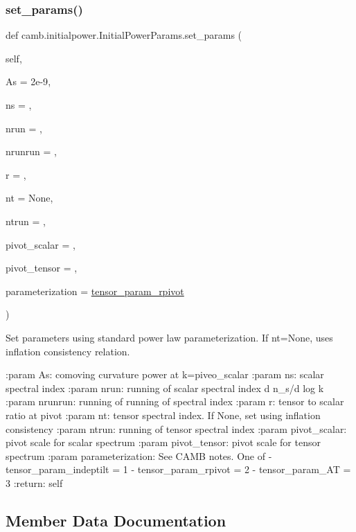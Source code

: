 \subsubsection{\texorpdfstring{set\+\_\+params()}{set\_params()}}
{\footnotesize\ttfamily def camb.\+initialpower.\+Initial\+Power\+Params.\+set\+\_\+params (\begin{DoxyParamCaption}\item[{}]{self,  }\item[{}]{As = {\ttfamily 2e-\/9},  }\item[{}]{ns = {},  }\item[{}]{nrun = {},  }\item[{}]{nrunrun = {},  }\item[{}]{r = {},  }\item[{}]{nt = {\ttfamily None},  }\item[{}]{ntrun = {},  }\item[{}]{pivot\+\_\+scalar = {},  }\item[{}]{pivot\+\_\+tensor = {},  }\item[{}]{parameterization = {\ttfamily \mbox{\hyperlink{namespacecamb_1_1initialpower_a87e33284f7a24c1dc055e2518360a86a}{tensor\+\_\+param\+\_\+rpivot}}} }\end{DoxyParamCaption})}

\begin{DoxyVerb}Set parameters using standard power law parameterization. If nt=None, uses inflation consistency relation.

:param As: comoving curvature power at k=piveo_scalar
:param ns: scalar spectral index
:param nrun: running of scalar spectral index d n_s/d log k
:param nrunrun: running of running of spectral index
:param r: tensor to scalar ratio at pivot
:param nt: tensor spectral index. If None, set using inflation consistency
:param ntrun: running of tensor spectral index
:param pivot_scalar: pivot scale for scalar spectrum
:param pivot_tensor:  pivot scale for tensor spectrum
:param parameterization: See CAMB notes. One of
    - tensor_param_indeptilt = 1
    - tensor_param_rpivot = 2
    - tensor_param_AT = 3
:return: self
\end{DoxyVerb}
 

\subsection{Member Data Documentation}
\mbox{\label{classcamb_1_1initialpower_1_1InitialPowerParams_aed3d8d753d0648c63a0db198188dd64a}} 
